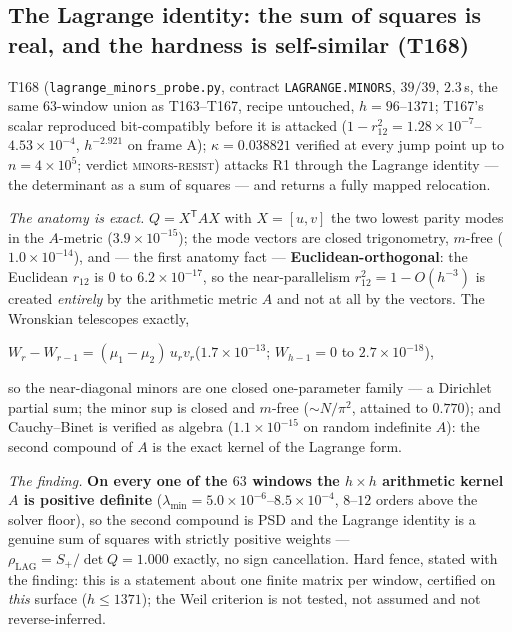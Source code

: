 \documentclass[11pt,a4paper]{article}
\begin{document}
\subsection{The Lagrange identity: the sum of squares is real, and the
hardness is self-similar (T168)}
T168 (\texttt{lagrange\_minors\_probe.py}, contract \texttt{LAGRANGE.MINORS},
$39/39$, $2.3$\,s, the same $63$-window union as T163--T167, recipe
untouched, $h=96$--$1371$; T167's scalar reproduced bit-compatibly before it
is attacked ($1-r_{12}^2=1.28\times10^{-7}$--$4.53\times10^{-4}$,
$h^{-2.921}$ on frame A); $\kappa=0.038821$ verified at every jump point up
to $n=4\times10^{5}$; verdict \textsc{minors-resist}) attacks R1 through the
Lagrange identity --- the determinant as a sum of squares --- and returns a
fully mapped relocation.

\emph{The anatomy is exact.} $Q=X^{\mathsf T}AX$ with $X=[u,v]$ the two
lowest parity modes in the $A$-metric ($3.9\times10^{-15}$); the mode
vectors are closed trigonometry, $m$-free ($1.0\times10^{-14}$), and ---
the first anatomy fact --- \textbf{Euclidean-orthogonal}: the Euclidean
$r_{12}$ is $0$ to $6.2\times10^{-17}$, so the near-parallelism
$r_{12}^2=1-O(h^{-3})$ is created \emph{entirely} by the arithmetic metric
$A$ and not at all by the vectors. The Wronskian telescopes exactly,
\begin{keyeq}$\displaystyle
W_r-W_{r-1}=(\mu_1-\mu_2)\,u_rv_r$\quad($1.7\times10^{-13}$;
$W_{h-1}=0$ to $2.7\times10^{-18}$),
\end{keyeq}
\noindent so the near-diagonal minors are one closed one-parameter family
--- a Dirichlet partial sum; the minor sup is closed and $m$-free
($\sim N/\pi^2$, attained to $0.770$); and Cauchy--Binet is verified as
algebra ($1.1\times10^{-15}$ on random indefinite $A$): the second compound
of $A$ is the exact kernel of the Lagrange form.

\emph{The finding.} \textbf{On every one of the $63$ windows the $h\times h$
arithmetic kernel $A$ is positive definite}
($\lambda_{\min}=5.0\times10^{-6}$--$8.5\times10^{-4}$, $8$--$12$ orders
above the solver floor), so the second compound is PSD and the Lagrange
identity is a genuine sum of squares with strictly positive weights ---
$\rho_{\mathrm{LAG}}=S_+/\det Q=1.000$ exactly, no sign cancellation. Hard
fence, stated with the finding: this is a statement about one finite matrix
per window, certified on \emph{this} surface ($h\le1371$); the Weil
criterion is not tested, not assumed and not reverse-inferred.
\end{document}
